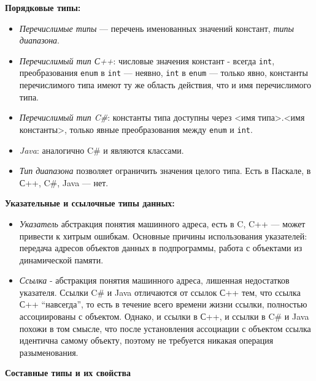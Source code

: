 \textbf{Порядковые типы:}
\begin{itemize}
    \item \textit{Перечислимые типы} --- перечень именованных значений констант, \textit{типы диапазона}. 
    \item \textit{Перечислимый тип С++}: числовые значения констант - всегда \texttt{int}, преобразования \texttt{enum} в \texttt{int} --- неявно, \texttt{int} в \texttt{enum} --- только явно, константы перечислимого типа имеют ту же область действия, что и имя перечислимого типа.
    \item \textit{Перечислимый тип C\#}: константы типа доступны через <имя типа>.<имя константы>, только явные преобразования между \texttt{enum} и \texttt{int}.
    \item \textit{Java}: аналогично C\# и являются классами.
    \item \textit{Тип диапазона} позволяет ограничить значения целого типа.
    Есть в Паскале, в С++, C\#, Java --- нет.
\end{itemize}

\textbf{Указательные и ссылочные типы данных:}
\begin{itemize}
    \item \textit{Указатель} абстракция понятия машинного адреса, есть в C, C++ --- может привести к хитрым ошибкам.
    Основные причины использования указателей: передача адресов объектов данных в подпрограммы, работа с объектами из динамической памяти.
    \item \textit{Ссылка} - абстракция понятия машинного адреса, лишенная недостатков указателя. 
    Ссылки C\# и Java отличаются от ссылок С++ тем, что ссылка С++ ``навсегда'', то есть в течение всего времени жизни ссылки, полностью ассоциированы с объектом. 
    Однако, и ссылки в С++, и ссылки в C\# и Java похожи в том смысле, что после установления ассоциации с объектом ссылка идентична самому объекту, поэтому не требуется никакая операция разыменования.
\end{itemize}

\textbf{Составные типы и их свойства}


